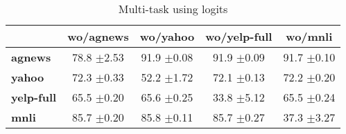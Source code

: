 \begin{table}[h]
	\fontsize{7}{10}
	\selectfont
	\begin{tabular}{lcccc}
		\toprule
		& \textbf{wo/agnews} & \textbf{wo/yahoo} & \textbf{wo/yelp-full} & \textbf{wo/mnli} \\
		\hline
		\textbf{agnews}    & 78.8 \tiny$\pm$2.53        & 91.9 \tiny$\pm$0.08        & 91.9   \tiny$\pm$0.09          & 91.7 \tiny$\pm$0.10       \\
		\textbf{yahoo}     & 72.3 \tiny$\pm$0.33        & 52.2 \tiny$\pm$1.72        & 72.1   \tiny$\pm$0.13          & 72.2 \tiny$\pm$0.20       \\
		\textbf{yelp-full} & 65.5 \tiny$\pm$0.20        & 65.6 \tiny$\pm$0.25        & 33.8   \tiny$\pm$5.12          & 65.5 \tiny$\pm$0.24       \\
		\textbf{mnli}      & 85.7 \tiny$\pm$0.20        & 85.8 \tiny$\pm$0.11        & 85.7   \tiny$\pm$0.27          & 37.3 \tiny$\pm$3.27      \\
		\bottomrule
	\end{tabular}
	\caption{Multi-task using logits}\label{tab:multi-use-logits-summary}
\end{table}